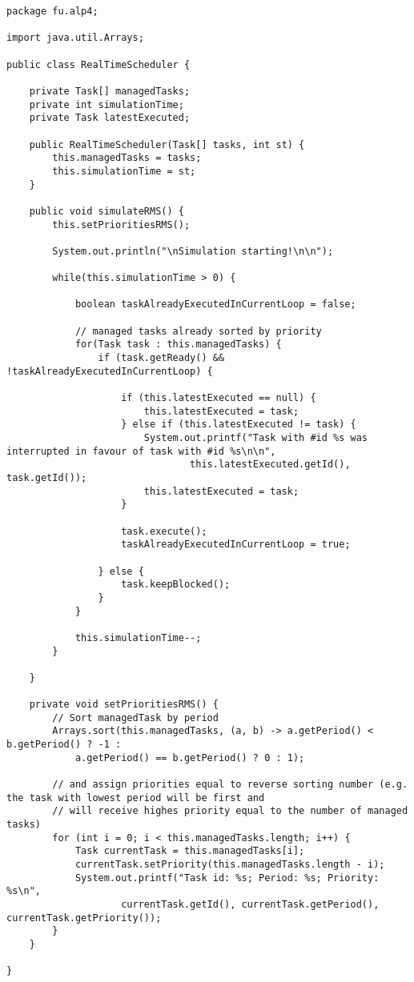 \begin{lstlisting}[style=java]
package fu.alp4;

import java.util.Arrays;

public class RealTimeScheduler {

    private Task[] managedTasks;
    private int simulationTime;
    private Task latestExecuted;

    public RealTimeScheduler(Task[] tasks, int st) {
        this.managedTasks = tasks;
        this.simulationTime = st;
    }

    public void simulateRMS() {
        this.setPrioritiesRMS();

        System.out.println("\nSimulation starting!\n\n");

        while(this.simulationTime > 0) {

            boolean taskAlreadyExecutedInCurrentLoop = false;

            // managed tasks already sorted by priority
            for(Task task : this.managedTasks) {
                if (task.getReady() && !taskAlreadyExecutedInCurrentLoop) {

                    if (this.latestExecuted == null) {
                        this.latestExecuted = task;
                    } else if (this.latestExecuted != task) {
                        System.out.printf("Task with #id %s was interrupted in favour of task with #id %s\n\n",
                                this.latestExecuted.getId(), task.getId());
                        this.latestExecuted = task;
                    }

                    task.execute();
                    taskAlreadyExecutedInCurrentLoop = true;

                } else {
                    task.keepBlocked();
                }
            }

            this.simulationTime--;
        }

    }

    private void setPrioritiesRMS() {
        // Sort managedTask by period
        Arrays.sort(this.managedTasks, (a, b) -> a.getPeriod() < b.getPeriod() ? -1 :
            a.getPeriod() == b.getPeriod() ? 0 : 1);

        // and assign priorities equal to reverse sorting number (e.g. the task with lowest period will be first and
        // will receive highes priority equal to the number of managed tasks)
        for (int i = 0; i < this.managedTasks.length; i++) {
            Task currentTask = this.managedTasks[i];
            currentTask.setPriority(this.managedTasks.length - i);
            System.out.printf("Task id: %s; Period: %s; Priority: %s\n",
                    currentTask.getId(), currentTask.getPeriod(), currentTask.getPriority());
        }
    }

}

\end{lstlisting}

